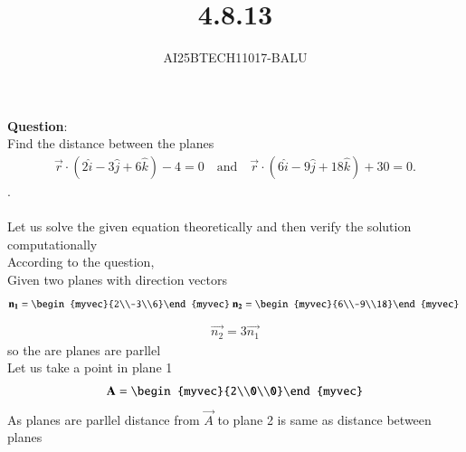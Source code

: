 \documentclass[journal]{IEEEtran}
\begin{document}

\vspace{3cm}

\title{4.8.13}
\author{AI25BTECH11017-BALU}
 \maketitle
{\let\newpage\relax\maketitle}
\renewcommand{\thefigure}{\theenumi}
\renewcommand{\thetable}{\theenumi}
\setlength{\intextsep}{10pt} %
\renewcommand{\thetable}{\theenumi}
\textbf{Question}:\\
 Find the distance between the planes 
\begin{align}
\vec{r} \cdot (2\hat{i} - 3\hat{j} + 6\hat{k}) - 4 = 0
\quad \text{and} \quad
\vec{r} \cdot (6\hat{i} - 9\hat{j} + 18\hat{k}) + 30 = 0.
\end{align}
.\\
\solution \\
Let us solve the given equation theoretically and then verify the solution computationally \\
According to the question, \\
Given two planes with direction vectors\\
\begin{align}
\vec{n_1}=\begin{myvec}{2\\-3\\6}\end{myvec}\
\vec{n_2}=\begin{myvec}{6\\-9\\18}\end{myvec}\
\end{align}
\begin{align}
    \vec{n_2}=3\vec{n_1}
\end{align}
so the are planes are parllel\\
Let us take a point in plane 1
\begin{align}
    \vec{A}=\begin{myvec}{2\\0\\0}\end{myvec}
\end{align}
As planes are parllel distance from $\vec{A}$ to plane 2 is same as distance between planes\\
\end{document}
